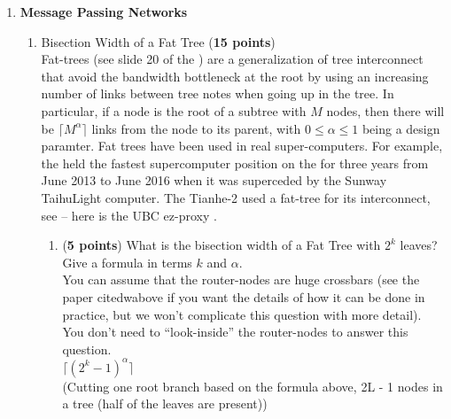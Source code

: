 \documentclass{article}
\newenvironment{answer}
{\color{blue}}
{\normalfont}
\begin{document}
\begin{enumerate}
  \item \textbf{Message Passing Networks}
    \begin{enumerate}
      \item Bisection Width of a Fat Tree (\textbf{15 points})\\
	Fat-trees
	(see slide 20 of the ) are a generalization of tree interconnect that avoid the
	bandwidth bottleneck at the root by using an increasing number of links between
	tree notes when going up in the tree.  In particular, if a node is the root of
	a subtree with $M$ nodes, then there will be $\lceil M^\alpha \rceil$ links from
	the node to its parent, with $0 \leq \alpha \leq 1$ being a design paramter.
	Fat trees have been used in real super-computers.
	For example, the
	 held
	the fastest supercomputer position on the
	 for three years
	from June 2013 to June 2016 when it was superceded by the Sunway TaihuLight
	computer.  The Tianhe-2 used a fat-tree for its interconnect, see
	 -- here is the UBC ez-proxy .
	\par
	\begin{enumerate}
	  \item (\textbf{5 points})
	    What is the bisection width of a Fat Tree with $2^k$ leaves?
	    Give a formula in terms $k$ and $\alpha$.\\
	    You can assume that the router-nodes are huge crossbars
	    (see the paper citedwabove if you want the details of how it can be done
	    in practice, but we won't complicate this question with more detail).
	    You don't need to ``look-inside'' the router-nodes to answer this question. \\
      \begin{answer}
        $\lceil (2^k - 1)^{\alpha} \rceil$ \\
        (Cutting one root branch based on the formula above, 2L - 1 nodes in a tree (half of the leaves are present))
      \end{answer}
      

\end{enumerate}
\end{enumerate}
\end{enumerate}
\end{document}
